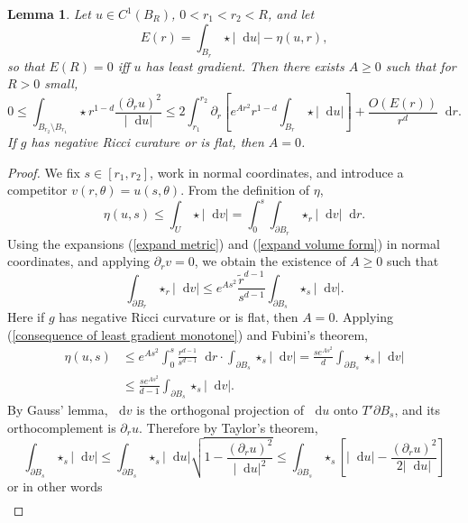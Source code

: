 \documentclass[reqno,10pt]{amsart}
\newcommand*\dif{\mathop{}\!\mathrm{d}}
\newtheorem{lemma}[theorem]{Lemma}
\theoremstyle{definition}
\numberwithin{equation}{section}
\begin{document}
\begin{lemma}\label{monotonicity lemma}
Let $u \in C^1(B_R)$, $0 < r_1 < r_2 < R$, and let
$$E(r) = \int_{B_r} \star |\dif u| - \eta(u, r),$$
so that $E(R) = 0$ iff $u$ has least gradient. Then there exists $A \geq 0$ such that for $R > 0$ small,
\begin{equation}\label{monotonicity lemma eqn}
0 \leq \int_{B_{r_2} \setminus B_{r_1}} \star r^{1 - d}\frac{(\partial_ru)^2}{|\dif u|} \leq 2\int_{r_1}^{r_2} \partial_r \left[e^{Ar^2} r^{1-d}\int_{B_r} \star |\dif u|\right] + \frac{O(E(r))}{r^d} \dif r.
\end{equation}
If $g$ has negative Ricci curature or is flat, then $A = 0$.
\end{lemma}
\begin{proof}
We fix $s \in [r_1, r_2]$, work in normal coordinates, and introduce a competitor $v(r, \theta) = u(s, \theta)$.
From the definition of $\eta$,
\begin{equation}\label{consequence of least gradient monotone}
    \eta(u, s) \leq \int_U \star |\dif v| = \int_0^s \int_{\partial B_r} \star_r |\dif v| \dif r.
\end{equation}
Using the expansions (\ref{expand metric}) and (\ref{expand volume form}) in normal coordinates, and applying $\partial_r v = 0$, we obtain the existence of $A \geq 0$ such that
\begin{equation}\label{introduce the ricci tensor}
\int_{\partial B_r} \star_r |\dif v| \leq e^{As^2} \frac{\tilde r^{d - 1}}{s^{d - 1}} \int_{\partial B_s} \star_s |\dif v|.
\end{equation}
Here if $g$ has negative Ricci curvature or is flat, then $A = 0$.
Applying (\ref{consequence of least gradient monotone}) and Fubini's theorem,
\begin{align*}
\eta(u, s) &\leq  e^{As^2} \int_0^s \frac{r^{d - 1}}{s^{d - 1}} \dif r \cdot \int_{\partial B_s} \star_s |\dif v| = \frac{s e^{As^2}}{d} \int_{\partial B_s} \star_s |\dif v|\\
&\leq \frac{s e^{As^2}}{d - 1} \int_{\partial B_s} \star_s |\dif v|.
\end{align*}
By Gauss' lemma, $\dif v$ is the orthogonal projection of $\dif u$ onto $T' \partial B_s$, and its orthocomplement is $\partial_r u$. Therefore by Taylor's theorem,
$$\int_{\partial B_s} \star_s |\dif v| \leq \int_{\partial B_s} \star_s |\dif u| \sqrt{1 - \frac{(\partial_r u)^2}{|\dif u|^2}} \leq \int_{\partial B_s} \star_s \left[|\dif u| - \frac{(\partial_r u)^2}{2 |\dif u|}\right]$$
or in other words
\begin{align*}

\end{align*}
\end{proof}
\end{document}
